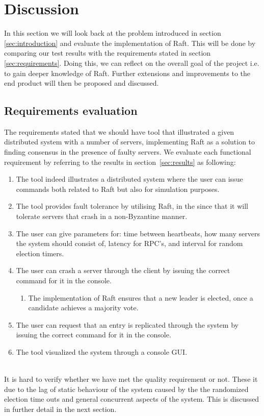 \section{Discussion} %
\label{sec:discussion}
In this section we will look back at the problem introduced in section \ref{sec:introduction} and evaluate the implementation of Raft. This will be done by comparing our test results with the requirements stated in section \ref{sec:requirements}. Doing this, we can reflect on the overall goal of the project i.e. to gain deeper knowledge of Raft. Further extensions and improvements to the end product will then be proposed and discussed.

\subsection{Requirements evaluation}
The requirements stated that we should have tool that illustrated a given distributed system with a number of servers, implementing Raft as a solution to finding consensus in the presence of faulty servers. We evaluate each functional requirement by referring to the results in section~\ref{sec:results} as following:

\begin{enumerate}
\item The tool indeed illustrates a distributed system where the user can issue commands both related to Raft but also for simulation purposes.
\item The tool provides fault tolerance by utilising Raft, in the since that it will tolerate servers that crash in a non-Byzantine manner.
\item The user can give parameters for: time between heartbeats, how many servers the system should consist of, latency for RPC's, and interval for random election timers.
\item The user can crash a server through the client by issuing the correct command for it in the console.
    \begin{enumerate}
    \item The implementation of Raft ensures that a new leader is elected, once a candidate achieves a majority vote.
    \end{enumerate}
\item The user can request that an entry is replicated through the system by issuing the correct command for it in the console.
\item The tool visualized the system through a console GUI.
\end{enumerate}
\\
It is hard to verify whether we have met the quality requirement or not. These it due to the lag of static behaviour of the system caused by the the randomized election time outs and general concurrent aspects of the system. This is discussed in further detail in the next section.

